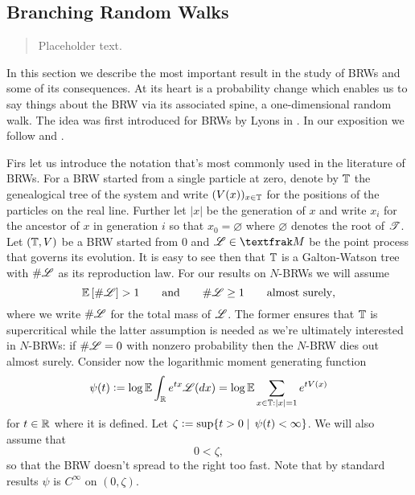 \subsection{Branching Random Walks}

\begin{quote}
{\small Placeholder text. }
\end{quote}

In this section we describe the most important result in the study of BRWs and some of its consequences. At its heart is a probability change which enables us to say things about the BRW via its associated spine, a one-dimensional random walk. The idea was first introduced for BRWs by Lyons in \cite{lyons1997simple}. In our exposition we follow \cite{mallein2018n} and \cite[Section 4.7]{shi2015branching}. 

Firs let us introduce the notation that's most commonly used in the literature of BRWs. For a BRW started from a single particle at zero, denote by $\mathbb{T}$ the genealogical tree of the system and write $(V(x))_{x \in \mathbb{T}}$ for the positions of the particles on the real line. Further let $|x|$ be the generation of $x$ and write $x_i$ for the ancestor of $x$ in generation $i$ so that $x_0 = \varnothing$ where $\varnothing$ denotes the root of $\mathscr{T}$. Let $(\mathbb{T}, V)$ be a BRW started from $0$ and $\scr{L} \in \frak{M}$ be the point process that governs its evolution. It is easy to see then that $\mathbb{T}$ is a Galton-Watson tree with $\# \mathscr{L}$ as its reproduction law. For our results on $N$-BRWs we will assume 
\begin{equation}
\mathbb{E}\left[ \# \mathscr{L} \right] > 1 \qquad\text{and}\qquad \# \mathscr{L} \geq 1 \qquad \text{almost surely},  
\end{equation}
where we write $\# \mathscr{L}$ for the total mass of $\mathscr{L}$. The former ensures that $\mathbb{T}$ is supercritical while the latter assumption is needed as we're ultimately interested in $N$-BRWs: if $\# \mathscr{L} = 0$ with nonzero probability then the $N$-BRW dies out almost surely. Consider now the logarithmic moment generating function
\begin{equation}
\psi(t) \vcentcolon= \log \mathbb{E} \int_{\mathbb{R}} e^{t x} \mathscr{L}(dx) = \log \mathbb{E} \sum\limits_{x \in \mathbb{T}: |x|=1} e^{t V(x)} 
\end{equation}
for $t \in \mathbb{R}$ where it is defined. Let $\zeta \vcentcolon= \sup\{ t > 0 \mid\, \psi(t) < \infty \}$. We will also assume that 
\begin{equation}\label{eqn:BRW_generator_finite}
0 < \zeta, 
\end{equation}
so that the BRW doesn't spread to the right too fast. Note that by standard results $\psi$ is $C^\infty$ on $(0, \zeta)$. 





